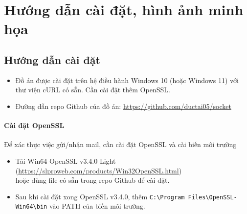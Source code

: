 \newpage
\section{Hướng dẫn cài đặt, hình ảnh minh họa}

\subsection{Hướng dẫn cài đặt}
\begin{itemize}
    \item Đồ án được cài đặt trên hệ điều hành Windows 10 (hoặc Windows 11) với thư viện cURL có sẵn. Cần cài đặt thêm OpenSSL.
    \item Đường dẫn repo Github của đồ án: \href{https://github.com/ductai05/socket}{https://github.com/ductai05/socket} \cite{repo}
\end{itemize}

\paragraph{Cài đặt OpenSSL}
\paragraph{}{Để xác thực việc gửi/nhận mail, cần cài đặt OpenSSL và cài biến môi trường}
\begin{itemize}
    \item Tải Win64 OpenSSL v3.4.0 Light (\href{https://slproweb.com/products/Win32OpenSSL.html}{https://slproweb.com/products/Win32OpenSSL.html}) \\ hoặc dùng file có sẵn trong repo Github để cài đặt.
    \item Sau khi cài đặt xong OpenSSL v3.4.0, thêm \texttt{C:\textbackslash Program Files\textbackslash OpenSSL-Win64\textbackslash bin} vào PATH của biến môi trường.
\end{itemize}

